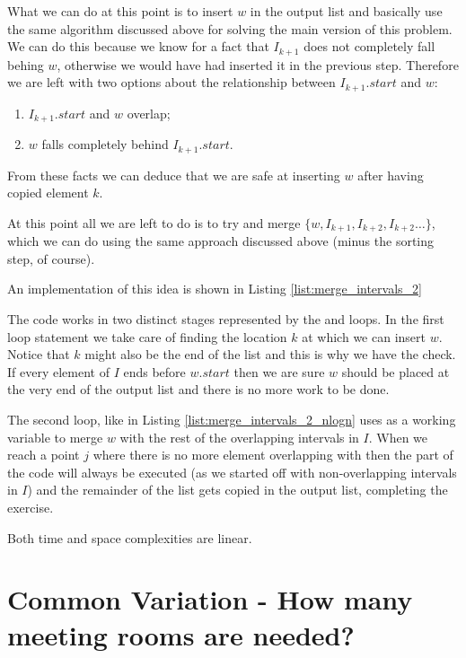 What we can do at this point is to insert $w$ in the output list and basically use the same algorithm discussed above for solving the main version of this problem. 
We can do this because we know for a fact that $I_{k+1}$ does not completely fall behing $w$, otherwise we would have had inserted it in the previous step.
Therefore we are left with two options about the relationship between $I_{k+1}.start$ and $w$:
\begin{enumerate}
	\item $I_{k+1}.start$ and $w$ overlap;
	\item $w$ falls completely behind $I_{k+1}.start$.
\end{enumerate}
From these facts we can deduce that we are safe at inserting $w$ after having copied element $k$.

At this point all we are left to do is to try and merge $\{w, I_{k+1},I_{k+2},I_{k+2}\ldots \}$, which we can do  using the same approach discussed above (minus the sorting step, of course).

An implementation of this idea is shown in Listing \ref{list:merge_intervals_2}



The code works in two distinct stages represented by the  and  loops. 
In the first loop statement we take care of finding the location $k$ at which we can insert $w$. 
Notice that $k$ might also be the end of the list and this is why we have the  check. If every element of $I$ ends before $w.start$ then we are sure $w$ should be placed at the very end of the output list and there is no more work to be done. 

The second loop, like in Listing \ref{list:merge_intervals_2_nlogn} uses  as a working variable to merge $w$ with the rest of the overlapping intervals in $I$. 
When we reach a point $j$ where there is no more element overlapping with  then the  part of the code will always be executed (as we started off with non-overlapping intervals in $I$) and the remainder of the list gets copied in the output list, completing the exercise.

Both time and space complexities are linear.




\section{Common Variation - How many meeting rooms are needed?}
